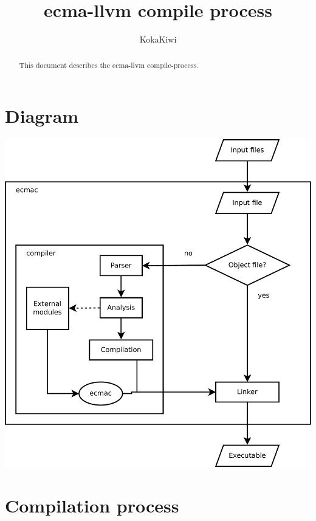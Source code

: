 \documentclass{article}
\title{ecma-llvm compile process}
\author{KokaKiwi}
\date{}
\begin{document}
    \maketitle

    \begin{abstract}

        This document describes the ecma-llvm compile-process.

    \end{abstract}

    \newpage
    \tableofcontents

    \newpage
    \section{Diagram}

        \begin{center}
            \includegraphics[width=16cm]{compile-flow-diagram.pdf}
        \end{center}

    \newpage
    \section{Compilation process}
\end{document}
